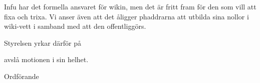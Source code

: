 \documentclass[../_main/handlingar.tex]{subfiles}
\begin{document}
\motionssvar
Infu har det formella ansvaret för wikin, men det är fritt fram för den som vill att fixa och trixa. Vi anser även att det åligger phaddrarna att utbilda sina nollor i wiki-vett i samband med att den offentliggörs. 

Styrelsen yrkar därför på

\begin{attsatser}
    \att avslå motionen i sin helhet.
\end{attsatser}


\begin{signatures}{1}
	\ist
	\signature{Daniel Bakic}{Ordförande}
\end{signatures}
\end{document}
